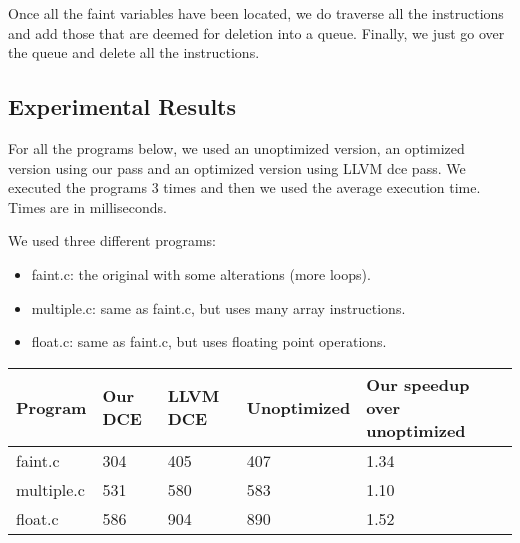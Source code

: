 \documentclass[12pt]{article}
\begin{document}
Once all the faint variables have been located, we do traverse all the instructions and add those that are deemed for deletion into a queue. Finally, we just go over the queue and delete all the instructions.

\subsection{Experimental Results}

For all the programs below, we used an unoptimized version, an optimized version using our pass and an optimized version using LLVM dce pass. We executed the programs 3 times and then we used the average execution time. Times are in milliseconds.

We used three different programs:

\begin{itemize}
   \item faint.c: the original with some alterations (more loops).
   \item multiple.c: same as faint.c, but uses many array instructions.
   \item float.c: same as faint.c, but uses floating point operations.
\end{itemize}

\begin{center}
    \begin{tabular}{ | l | l | l | l | l |}
    \hline
    Program & Our DCE & LLVM DCE & Unoptimized & Our speedup over unoptimized \\ \hline
    faint.c & 304 & 405 & 407 & 1.34 \\ \hline
    multiple.c & 531 & 580 & 583 & 1.10 \\ \hline
    float.c & 586 & 904 & 890 & 1.52 \\ \hline
    \hline
    \end{tabular}
\end{center}
\end{document}
